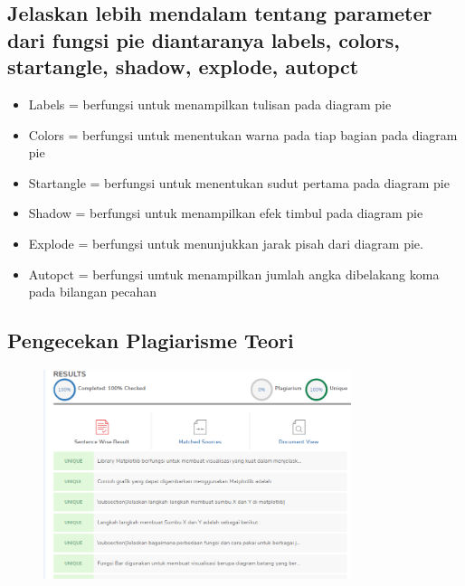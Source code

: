 \subsection{Jelaskan lebih mendalam tentang parameter dari fungsi pie diantaranya labels, colors, startangle, shadow, explode, autopct}
\begin{itemize}
    \item Labels = berfungsi untuk menampilkan tulisan pada diagram pie
    \item Colors = berfungsi untuk menentukan warna pada tiap bagian pada diagram pie
    \item Startangle = berfungsi untuk menentukan sudut pertama pada diagram pie
    \item Shadow = berfungsi untuk menampilkan efek timbul pada diagram pie
    \item Explode = berfungsi untuk menunjukkan jarak pisah dari diagram pie.
    \item Autopct = berfungsi umtuk menampilkan jumlah angka dibelakang koma pada bilangan pecahan
\end{itemize}

\subsection{Pengecekan Plagiarisme Teori}
\begin{figure}[H]
    \includegraphics[width=9cm]{figures/6/Teori/1174051/plagiat.png}
    \centering
\end{figure}
